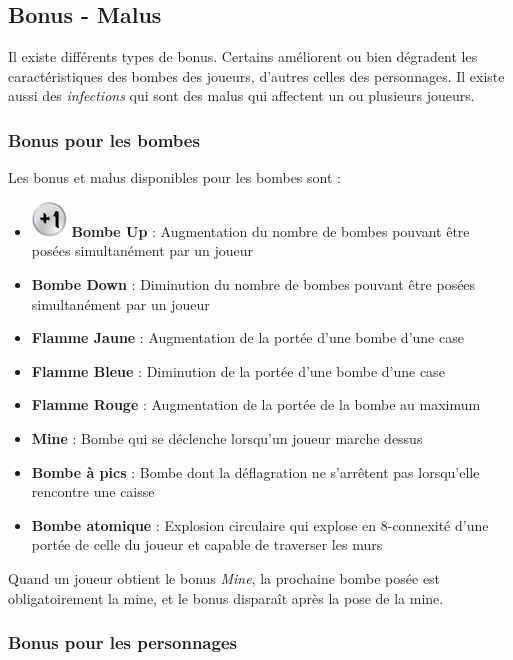 \subsection{Bonus - Malus}

Il existe différents types de bonus. Certains améliorent ou bien dégradent les caractéristiques des bombes des joueurs, d'autres celles des personnages. Il existe aussi des \textit{infections} qui sont des malus qui affectent un ou plusieurs joueurs.

\subsubsection{Bonus pour les bombes}

Les bonus et malus disponibles pour les bombes sont :
\begin{itemize}
\item \includegraphics{images/bombMore.png} \textbf{Bombe Up} : Augmentation du nombre de bombes pouvant être posées simultanément par un joueur
\item \textbf{Bombe Down} : Diminution du nombre de bombes pouvant être posées simultanément par un joueur
\item \textbf{Flamme Jaune} : Augmentation de la portée d'une bombe d'une case
\item \textbf{Flamme Bleue} : Diminution de la portée d'une bombe d'une case
\item \textbf{Flamme Rouge} : Augmentation de la portée de la bombe au maximum
\item \textbf{Mine} : Bombe qui se déclenche lorsqu'un joueur marche dessus
\item \textbf{Bombe à pics} : Bombe dont la déflagration ne s'arrêtent pas lorsqu'elle rencontre une caisse
\item \textbf{Bombe atomique} : Explosion circulaire qui explose en 8-connexité d'une portée de celle du joueur et capable de traverser les murs
\end{itemize}

\vspace{0.3cm}

Quand un joueur obtient le bonus \textit{Mine}, la prochaine bombe posée est obligatoirement la mine, et le bonus disparaît après la pose de la mine.

\subsubsection{Bonus pour les personnages}

